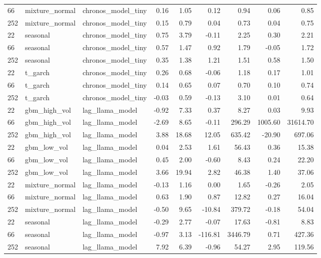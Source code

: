 {\begin{tabular}{lllrrrrrr}
66 & mixture\_normal & chronos\_model\_tiny & 0.16 & 1.05 & 0.12 & 0.94 & 0.06 & 0.85 \\
252 & mixture\_normal & chronos\_model\_tiny & 0.15 & 0.79 & 0.04 & 0.73 & 0.04 & 0.75 \\
\midrule
22 & seasonal & chronos\_model\_tiny & 0.75 & 3.79 & -0.11 & 2.25 & 0.30 & 2.21 \\
66 & seasonal & chronos\_model\_tiny & 0.57 & 1.47 & 0.92 & 1.79 & -0.05 & 1.72 \\
252 & seasonal & chronos\_model\_tiny & 0.35 & 1.38 & 1.21 & 1.51 & 0.58 & 1.50 \\
\midrule
22 & t\_garch & chronos\_model\_tiny & 0.26 & 0.68 & -0.06 & 1.18 & 0.17 & 1.01 \\
66 & t\_garch & chronos\_model\_tiny & 0.14 & 0.65 & 0.07 & 0.70 & 0.10 & 0.74 \\
252 & t\_garch & chronos\_model\_tiny & -0.03 & 0.59 & -0.13 & 3.10 & 0.01 & 0.64 \\
\midrule
22 & gbm\_high\_vol & lag\_llama\_model & -0.92 & 7.33 & 0.37 & 8.27 & 0.03 & 9.93 \\
66 & gbm\_high\_vol & lag\_llama\_model & -2.69 & 8.65 & -0.11 & 296.29 & 1005.60 & 31614.70 \\
252 & gbm\_high\_vol & lag\_llama\_model & 3.88 & 18.68 & 12.05 & 635.42 & -20.90 & 697.06 \\
\midrule
22 & gbm\_low\_vol & lag\_llama\_model & 0.04 & 2.53 & 1.61 & 56.43 & 0.36 & 15.38 \\
66 & gbm\_low\_vol & lag\_llama\_model & 0.45 & 2.00 & -0.60 & 8.43 & 0.24 & 22.20 \\
252 & gbm\_low\_vol & lag\_llama\_model & 3.66 & 19.94 & 2.82 & 46.38 & 1.40 & 37.06 \\
\midrule
22 & mixture\_normal & lag\_llama\_model & -0.13 & 1.16 & 0.00 & 1.65 & -0.26 & 2.05 \\
66 & mixture\_normal & lag\_llama\_model & 0.63 & 1.90 & 0.87 & 12.82 & 0.27 & 16.04 \\
252 & mixture\_normal & lag\_llama\_model & -0.50 & 9.65 & -10.84 & 379.72 & -0.18 & 54.04 \\
\midrule
22 & seasonal & lag\_llama\_model & -0.29 & 2.77 & -0.07 & 17.63 & -0.81 & 8.83 \\
66 & seasonal & lag\_llama\_model & -0.97 & 3.13 & -116.81 & 3446.79 & 0.71 & 427.36 \\
252 & seasonal & lag\_llama\_model & 7.92 & 6.39 & -0.96 & 54.27 & 2.95 & 119.56 \\
\midrule

\end{tabular}}
